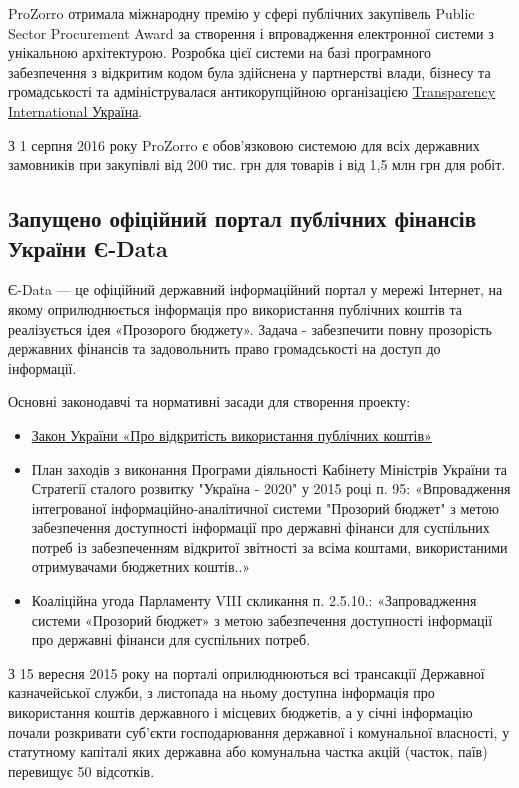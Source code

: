 ProZorro отримала міжнародну премію у сфері публічних закупівель Public Sector Procurement Award за створення і впровадження електронної системи з унікальною архітектурою. Розробка цієї системи на базі програмного забезпечення з відкритим кодом була здійснена у партнерстві влади, бізнесу та громадськості та адмініструвалася антикорупційною організацією \href{https://uk.wikipedia.org/wiki/%D0%A2%D1%80%D0%B0%D0%BD%D1%81%D0%BF%D0%B5%D1%80%D0%B5%D0%BD%D1%81%D1%96_%D0%86%D0%BD%D1%82%D0%B5%D1%80%D0%BD%D0%B5%D1%88%D0%BD}{Transparency International Україна}.

З 1 серпня 2016 року ProZorro є обов'язковою системою для всіх державних замовників при закупівлі від 200 тис. грн для товарів і від 1,5 млн грн для робіт.

\subsection{Запущено офіційний портал публічних фінансів України Є-Data}

Є-Data — це офіційний державний інформаційний портал у мережі Інтернет, на якому оприлюднюється інформація про використання публічних коштів та реалізується ідея «Прозорого бюджету». Задача - забезпечити повну прозорість державних фінансів та задовольнить право громадськості на доступ до інформації.

Основні законодавчі та нормативні засади для створення проекту:
\begin{itemize}
    \item \href{http://zakon3.rada.gov.ua/laws/show/183-19}{Закон України «Про відкритість використання публічних коштів»}
    \item План заходів з виконання Програми діяльності Кабінету Міністрів України та Стратегії сталого розвитку "Україна - 2020" у 2015 році п. 95: «Впровадження інтегрованої інформаційно-аналітичної системи "Прозорий бюджет" з метою забезпечення доступності інформації про державні фінанси для суспільних потреб із забезпеченням відкритої звітності за всіма коштами, використаними отримувачами бюджетних коштів..»
    \item Коаліційна угода Парламенту VIII скликання п. 2.5.10.: «Запровадження системи «Прозорий бюджет» з метою забезпечення доступності інформації про державні фінанси для суспільних потреб.
\end{itemize}

З 15 вересня 2015 року на порталі оприлюднюються всі трансакції Державної казначейської служби, з листопада на ньому доступна інформація про використання коштів державного і місцевих бюджетів, а у січні інформацію почали розкривати суб'єкти господарювання державної і комунальної власності, у статутному капіталі яких державна або комунальна частка акцій (часток, паїв) перевищує 50 відсотків.

